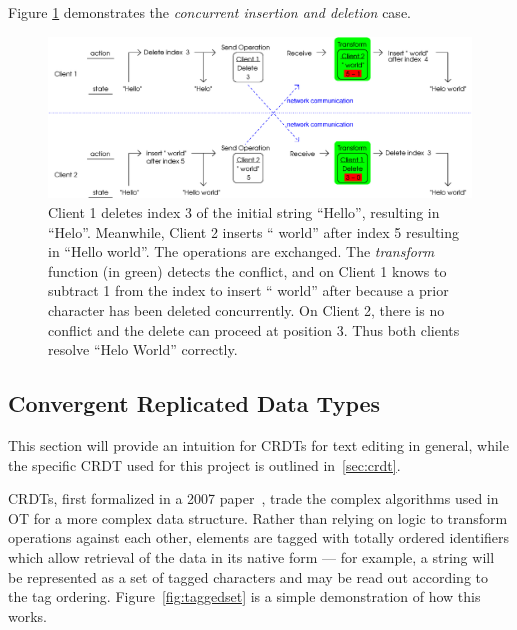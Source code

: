 \documentclass[12pt,a4paper,twoside,openright]{report}
\begin{document}
	Figure \ref{fig:ot3} demonstrates the \textit{concurrent insertion and deletion} case.
	

	\begin{figure}[H]
	\centering
	\includegraphics[width=1\linewidth]{figs/ot3.eps}
	\caption[Operational Transformations --- concurrent insertion and deletion]{Client 1 deletes index 3 of the initial string ``Hello'', resulting in ``Helo''. Meanwhile, Client 2 inserts `` world'' after index 5 resulting in ``Hello world''. The operations are exchanged. The \textit{transform} function (in green) detects the conflict, and on Client 1 knows to subtract 1 from the index to insert `` world'' after because a prior character has been deleted concurrently. On Client 2, there is no conflict and the delete can proceed at position 3. Thus both clients resolve ``Helo World'' correctly.}
	\label{fig:ot3}
	\end{figure}


	\subsection{Convergent Replicated Data Types} \label{sec:crdtoverview}
	
	This section will provide an intuition for CRDTs for text editing in general, while the specific CRDT used for this project is outlined in~\cref{sec:crdt}.

	CRDTs, first formalized in a 2007 paper~\cite{shapiro2007}, trade the complex algorithms used in OT for a more complex data structure. Rather than relying on logic to transform operations against each other, elements are tagged with totally ordered identifiers which allow retrieval of the data in its native form --- for example, a string will be represented as a set of tagged characters and may be read out according to the tag ordering. Figure~\ref{fig:taggedset} is a simple demonstration of how this works. 
	
\end{document}

